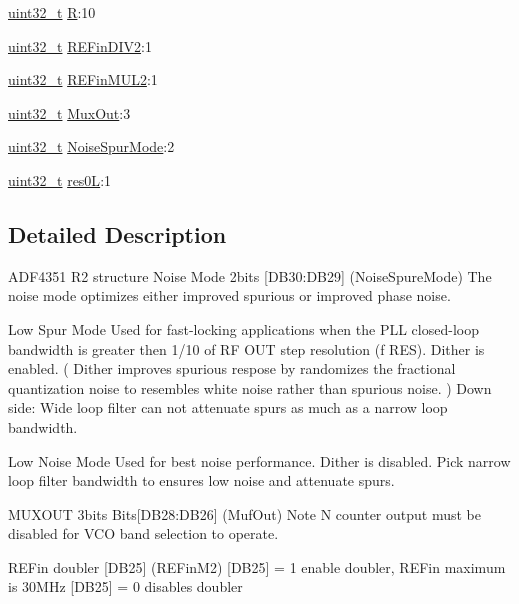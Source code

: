 \begin{DoxyCompactItemize}
\item 
\hyperlink{send_8c_a435d1572bf3f880d55459d9805097f62}{uint32\+\_\+t} \hyperlink{structr2__t_a0abc2956b7cbc989552c17264973d24d}{R}\+:10
\item 
\hyperlink{send_8c_a435d1572bf3f880d55459d9805097f62}{uint32\+\_\+t} \hyperlink{structr2__t_aa036b7abbb6147e0c155101addc1490c}{R\+E\+Fin\+D\+I\+V2}\+:1
\item 
\hyperlink{send_8c_a435d1572bf3f880d55459d9805097f62}{uint32\+\_\+t} \hyperlink{structr2__t_aa675f6a674217e14be9e3e1754530a78}{R\+E\+Fin\+M\+U\+L2}\+:1
\item 
\hyperlink{send_8c_a435d1572bf3f880d55459d9805097f62}{uint32\+\_\+t} \hyperlink{structr2__t_a284292bd7e449b3c4641639ed6826310}{Mux\+Out}\+:3
\item 
\hyperlink{send_8c_a435d1572bf3f880d55459d9805097f62}{uint32\+\_\+t} \hyperlink{structr2__t_a40bc8b8cb7d9e77e57abd0e8be4f01af}{Noise\+Spur\+Mode}\+:2
\item 
\hyperlink{send_8c_a435d1572bf3f880d55459d9805097f62}{uint32\+\_\+t} \hyperlink{structr2__t_af67e412a4c526894fee5ce321dfce083}{res0L}\+:1
\end{DoxyCompactItemize}


\subsection{Detailed Description}
A\+D\+F4351 R2 structure Noise Mode 2bits \mbox{[}D\+B30\+:D\+B29\mbox{]} (Noise\+Spure\+Mode) The noise mode optimizes either improved spurious or improved phase noise. 

Low Spur Mode Used for fast-\/locking applications when the P\+LL closed-\/loop bandwidth is greater then 1/10 of RF O\+UT step resolution (f R\+ES). Dither is enabled. ( Dither improves spurious respose by randomizes the fractional quantization noise to resembles white noise rather than spurious noise. ) Down side\+: Wide loop filter can not attenuate spurs as much as a narrow loop bandwidth.

Low Noise Mode Used for best noise performance. Dither is disabled. Pick narrow loop filter bandwidth to ensures low noise and attenuate spurs.

M\+U\+X\+O\+UT 3bits Bits\mbox{[}D\+B28\+:D\+B26\mbox{]} (Muf\+Out) Note N counter output must be disabled for V\+CO band selection to operate.

R\+E\+Fin doubler \mbox{[}D\+B25\mbox{]} (R\+E\+Fin\+M2) \mbox{[}D\+B25\mbox{]} = 1 enable doubler, R\+E\+Fin maximum is 30\+M\+Hz \mbox{[}D\+B25\mbox{]} = 0 disables doubler

